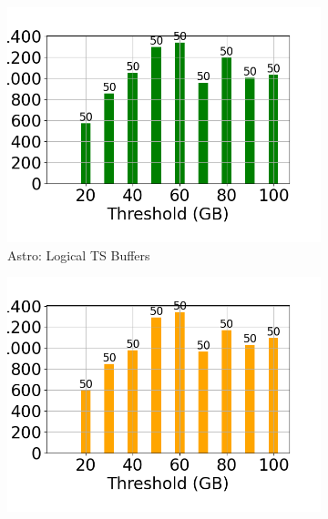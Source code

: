 \begin{figure}
	\centering
	\begin{subfigure}[c]{0.48\textwidth}
		\includegraphics[width=1\textwidth]   {figures/Experiments/Dynamic/ASTRO/Batch_processing/60/average_query_time_per_batch_version_999777015_10485760_10_delay[60].png}
		\caption{Astro: Logical TS Buffers}
		\label{fig:logical-ts-60-astro}
	\end{subfigure}
	\begin{subfigure}[c]{0.48\textwidth}
		\includegraphics[width=1\textwidth]	 {figures/Experiments/Dynamic/ASTRO/Batch_processing/60/average_query_time_per_batch_version_999777018_10485760_10_delay[60].png}

\end{subfigure}
\end{figure}
